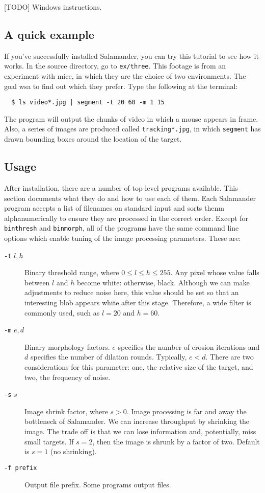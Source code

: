 \documentclass[letter]{article}
\newcounter{foot}
\begin{document}
[TODO] Windows instructions.

\subsection{A quick example} 
If you've successfully installed Salamander, you can try this tutorial to see how it 
works. In the source directory, go to \texttt{ex/three}. This footage is from an 
experiment with mice, in which they are the choice of two environments. The goal 
wsa to find out which they prefer. Type the following at the terminal:
\begin{verbatim}
  $ ls video*.jpg | segment -t 20 60 -m 1 15 
\end{verbatim}
The program will output the chunks of video in which a mouse appears in frame. Also,
a series of images are produced called \texttt{tracking*.jpg}, in which \texttt{segment}
has drawn bounding boxes around the location of the target. 

\subsection{Usage} 
After installation, there are a number of top-level programs available. This section
documents what they do and how to use each of them. Each Salamander program accepts a 
list of filenames on standard input and sorts thenm alphanumerically to ensure they are 
processed in the correct order. Except for \texttt{binthresh} and \texttt{binmorph}, 
all of the programs have the same command line options which enable tuning of the 
image processing parameters. These are: 
\begin{description}
  \item[\texttt{-t} $l, h$] Binary threshold range, where $0 \le l \le h \le 255$. Any 
   pixel whose value falls between $l$ and $h$ become white: otherwise, black. Although
   we can make adjustments to reduce noise here, this value should be set so that an 
   interesting blob appears white after this stage. Therefore, a wide filter is commonly 
   used, such as $l=20$ and $h=60$. 
   
  \item[\texttt{-m} $e, d$] Binary morphology factors. $e$ specifies the number of 
   erosion iterations and $d$ specifies the number of dilation rounds. Typically, 
   $e < d$. There are two considerations for this parameter: one, the relative size 
   of the target, and two, the frequency of noise.
   
  \item[\texttt{-s} $s$] Image shrink factor, where $s > 0$. Image processing is far 
   and away the bottleneck of Salamander. We can increase throughput by shrinking the
   image. The trade off is that we can lose information and, potentially, miss small 
   targets. If $s=2$, then the image is shrunk by a factor of two. Default is $s=1$ 
   (no shrinking). 
   
  \item[\texttt{-f prefix}] Output file prefix. Some programs output files. 
\end{description}
\end{document}
